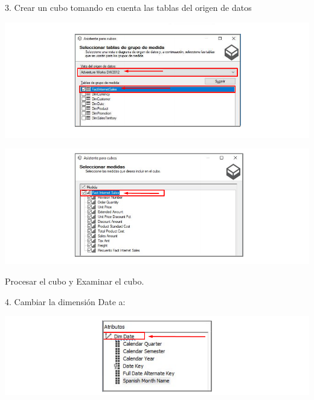 3. Crear un cubo tomando en cuenta las tablas del origen de datos

	\begin{center}
	\includegraphics[width=\columnwidth]{images/task2/img4}
    \end{center}	

	\begin{center}
	\includegraphics[width=\columnwidth]{images/task2/img5}
    \end{center}	
		
	Procesar el cubo y Examinar el cubo.

4. Cambiar la dimensión Date a:

	\begin{center}
	\includegraphics[width=\columnwidth]{images/task2/img6}
    \end{center}	



    